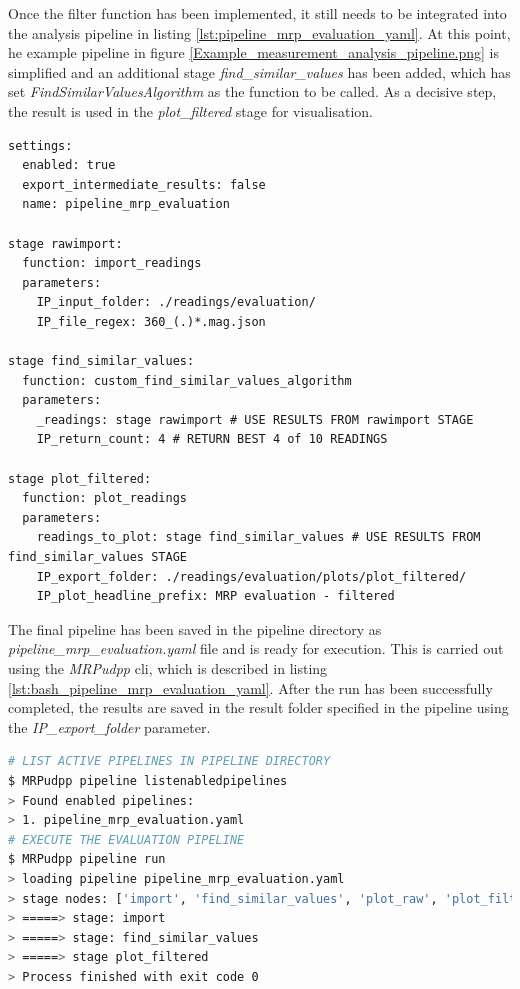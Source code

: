 Once the filter function has been implemented, it still needs to be
integrated into the analysis pipeline in listing
\ref{lst:pipeline_mrp_evaluation_yaml}. At this point, he example
pipeline in figure \ref{Example_measurement_analysis_pipeline.png} is
simplified and an additional stage \emph{find\_similar\_values} has been
added, which has set \emph{FindSimilarValuesAlgorithm} as the function
to be called. As a decisive step, the result is used in the
\emph{plot\_filtered} stage for visualisation.

\begin{lstlisting}[caption={User defined processing pipeline using custom implemented filter algorithm}, label=lst:pipeline_mrp_evaluation_yaml]
settings:
  enabled: true
  export_intermediate_results: false
  name: pipeline_mrp_evaluation

stage rawimport:
  function: import_readings
  parameters:
    IP_input_folder: ./readings/evaluation/
    IP_file_regex: 360_(.)*.mag.json

stage find_similar_values:
  function: custom_find_similar_values_algorithm
  parameters:
    _readings: stage rawimport # USE RESULTS FROM rawimport STAGE
    IP_return_count: 4 # RETURN BEST 4 of 10 READINGS

stage plot_filtered:
  function: plot_readings
  parameters:
    readings_to_plot: stage find_similar_values # USE RESULTS FROM find_similar_values STAGE
    IP_export_folder: ./readings/evaluation/plots/plot_filtered/
    IP_plot_headline_prefix: MRP evaluation - filtered
\end{lstlisting}

The final pipeline has been saved in the pipeline directory as
\emph{pipeline\_mrp\_evaluation.yaml} file and is ready for execution.
This is carried out using the \emph{MRPudpp} \gls{cli}, which is
described in listing \ref{lst:bash_pipeline_mrp_evaluation_yaml}. After
the run has been successfully completed, the results are saved in the
result folder specified in the pipeline using the
\emph{IP\_export\_folder} parameter.

\begin{lstlisting}[language=bash, caption={Bash result log of the analysis pipeline run}, label=lst:bash_pipeline_mrp_evaluation_yaml]
# LIST ACTIVE PIPELINES IN PIPELINE DIRECTORY 
$ MRPudpp pipeline listenabledpipelines
> Found enabled pipelines:
> 1. pipeline_mrp_evaluation.yaml
# EXECUTE THE EVALUATION PIPELINE
$ MRPudpp pipeline run
> loading pipeline pipeline_mrp_evaluation.yaml
> stage nodes: ['import', 'find_similar_values', 'plot_raw', 'plot_filtered']
> =====> stage: import 
> =====> stage: find_similar_values 
> =====> stage plot_filtered 
> Process finished with exit code 0
\end{lstlisting}

